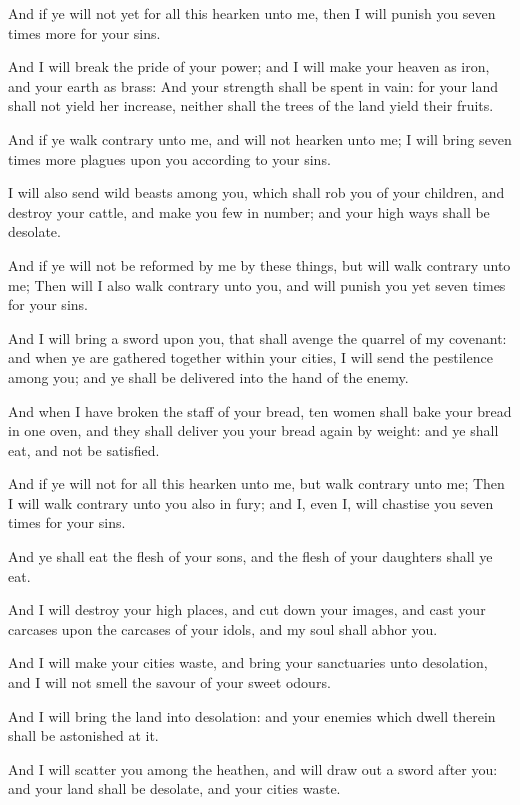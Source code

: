 \Verse And if ye will not yet for all this hearken unto me, then I will punish you seven times more for your sins.

\Verse And I will break the pride of your power; and I will make your heaven as iron, and your earth as brass: \Verse And your strength shall be spent in vain: for your land shall not yield her increase, neither shall the trees of the land yield their fruits.

\Verse And if ye walk contrary unto me, and will not hearken unto me; I will bring seven times more plagues upon you according to your sins.

\Verse I will also send wild beasts among you, which shall rob you of your children, and destroy your cattle, and make you few in number; and your high ways shall be desolate.

\Verse And if ye will not be reformed by me by these things, but will walk contrary unto me; \Verse Then will I also walk contrary unto you, and will punish you yet seven times for your sins.

\Verse And I will bring a sword upon you, that shall avenge the quarrel of my covenant: and when ye are gathered together within your cities, I will send the pestilence among you; and ye shall be delivered into the hand of the enemy.

\Verse And when I have broken the staff of your bread, ten women shall bake your bread in one oven, and they shall deliver you your bread again by weight: and ye shall eat, and not be satisfied.

\Verse And if ye will not for all this hearken unto me, but walk contrary unto me; \Verse Then I will walk contrary unto you also in fury; and I, even I, will chastise you seven times for your sins.

\Verse And ye shall eat the flesh of your sons, and the flesh of your daughters shall ye eat.

\Verse And I will destroy your high places, and cut down your images, and cast your carcases upon the carcases of your idols, and my soul shall abhor you.

\Verse And I will make your cities waste, and bring your sanctuaries unto desolation, and I will not smell the savour of your sweet odours.

\Verse And I will bring the land into desolation: and your enemies which dwell therein shall be astonished at it.

\Verse And I will scatter you among the heathen, and will draw out a sword after you: and your land shall be desolate, and your cities waste.

